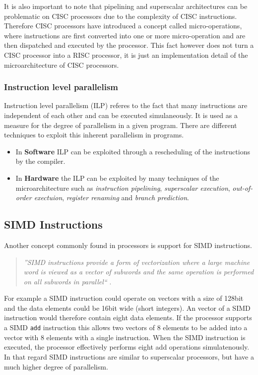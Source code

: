 \documentclass[a4paper,10pt]{article}
\begin{document}
It is also important to note that pipelining and superscalar architectures can be problematic on CISC processors due to the complexity of 
CISC instructions. Therefore CISC processors have introduced a concept called micro-operations, where instructions are first converted 
into one or more micro-operation and are then dispatched and executed by the processor. This fact however does not turn a CISC processor 
into a RISC processor, it is just an implementation detail of the microarchitecture of CISC processors.

\subsubsection*{Instruction level parallelism}
Instruction level parallelism (ILP) referes to the fact that many instructions are independent of each other and can be 
executed simulaneously. It is used as a measure for the degree of parallelism in a given program. There are different techniques to 
exploit this inherent parallelism in programs.
\begin{itemize}
 \item In \textbf{Software} ILP can be exploited through a rescheduling of the instructions by the compiler.
 \item In \textbf{Hardware} the ILP can be exploited by many techniques of the microarchitecture such as \textit{instruction pipelining}, 
 \textit{superscalar execution}, \textit{out-of-order exectuion}, \textit{register renaming} and \textit{branch prediction}.
\end{itemize}

\subsection{SIMD Instructions}
Another concept commonly found in processors is support for SIMD instructions.
\begin{quote}
    \textit{''SIMD instructions provide a form of vectorization where a large machine word is viewed as a vector of subwords and the same 
    operation is performed on all subwords in parallel``} \cite{simd}. 
\end{quote}
For example a SIMD instruction could operate on vectors with a size of 128bit and the data elements could be 16bit wide (short integers). 
An vector of a SIMD instruction would therefore contain eight data elements. If the processor supports a SIMD \lstinline{add} instruction 
this allows two vectors of 8 elements to be added into a vector with 8 elements with a single instruction. When the SIMD instruction is 
executed, the processor effectively performs eight add operations simulatenously. In that regard SIMD instructions are similar to 
superscalar processors, but have a much higher degree of parallelism.
\end{document}
